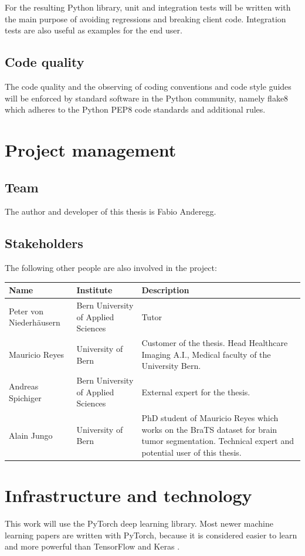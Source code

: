 For the resulting Python library, unit and integration tests will be written with the main purpose of avoiding regressions and breaking client code. Integration tests are also useful as examples for the end user.

\subsection{Code quality}
The code quality and the observing of coding conventions and code style guides will be enforced by standard software in the Python community, namely flake8 which adheres to the Python PEP8 code standards and additional rules.

\section{Project management}
    \subsection{Team}
    The author and developer of this thesis is Fabio Anderegg.
    
    \subsection{Stakeholders}
    The following other people are also involved in the project:
    
    \begin{tabular}{| p{4cm} | p{3.5cm} | p{8cm} |}
        \hline
        \textbf{Name} & \textbf{Institute} & \textbf{Description} \\ \hline
        Peter von Niederhäusern & Bern University of Applied Sciences & Tutor \\ \hline
        Mauricio Reyes & University of Bern & Customer of the thesis. 
        Head Healthcare Imaging A.I., Medical faculty of the University Bern. \\ \hline
        Andreas Spichiger & Bern University of Applied Sciences & External expert for the thesis. \\ \hline
        Alain Jungo & University of Bern & PhD student of Mauricio Reyes which works on the BraTS dataset for brain tumor segmentation. Technical expert and potential user of this thesis. \\ \hline
    \end{tabular}

\section{Infrastructure and technology}
This work will use the PyTorch \cite{paszke2017automatic} deep learning library. Most newer machine learning papers are written with PyTorch, because it is considered easier to learn and more powerful than TensorFlow and Keras \cite{pytorchvstensorflow}.

